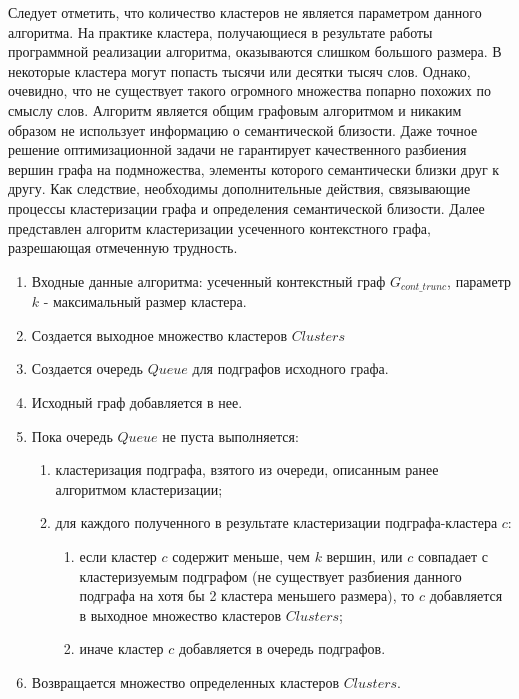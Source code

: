 Следует отметить, что количество кластеров не является параметром данного алгоритма. На практике кластера, получающиеся в результате работы программной реализации алгоритма, оказываются слишком большого размера. В некоторые кластера могут попасть тысячи или десятки тысяч слов. Однако,  очевидно, что не существует такого огромного множества попарно похожих по смыслу слов. Алгоритм является общим графовым алгоритмом и никаким образом не использует информацию о семантической близости. Даже точное решение оптимизационной задачи не гарантирует качественного разбиения вершин графа на подмножества, элементы которого семантически близки друг к другу. Как следствие, необходимы дополнительные действия, связывающие процессы кластеризации графа и определения семантической близости. Далее представлен алгоритм кластеризации усеченного контекстного графа, разрешающая отмеченную трудность.

\begin{enumerate}
    \item Входные данные алгоритма: усеченный контекстный граф $G_{cont\_trunc}$, параметр $k$ - максимальный размер кластера.
    \item Создается выходное множество кластеров $Clusters$
    \item Создается очередь $Queue$ для подграфов исходного графа.
    \item Исходный граф добавляется в нее.
    \item Пока очередь $Queue$ не пуста выполняется:
    \begin{enumerate}
        \item кластеризация подграфа, взятого из очереди, описанным ранее алгоритмом кластеризации;
        \item для каждого полученного в результате кластеризации подграфа-кластера $c$:
            \begin{enumerate}
                \item если кластер $c$ содержит меньше, чем $k$ вершин, или $c$ совпадает с кластеризуемым подграфом (не существует разбиения данного подграфа на хотя бы 2 кластера меньшего размера), то $c$ добавляется в выходное множество кластеров $Clusters$;
                \item иначе кластер $c$ добавляется в очередь подграфов.
            \end{enumerate}
    \end{enumerate}
    \item Возвращается множество определенных кластеров $Clusters$.
\end{enumerate}

